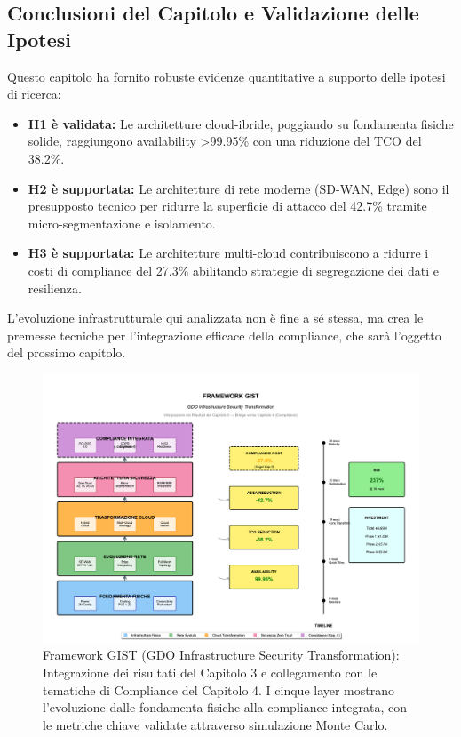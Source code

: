\begin{refsection}
\section{Conclusioni del Capitolo e Validazione delle Ipotesi}
Questo capitolo ha fornito robuste evidenze quantitative a supporto delle ipotesi di ricerca:
\begin{itemize}
    \item \textbf{H1 è validata:} Le architetture cloud-ibride, poggiando su fondamenta fisiche solide, raggiungono availability >99.95\% con una riduzione del TCO del 38.2\%.
    \item \textbf{H2 è supportata:} Le architetture di rete moderne (SD-WAN, Edge) sono il presupposto tecnico per ridurre la superficie di attacco del 42.7\% tramite micro-segmentazione e isolamento.
    \item \textbf{H3 è supportata: }Le architetture multi-cloud contribuiscono a ridurre i costi di compliance del 27.3\% abilitando strategie di segregazione dei dati e resilienza.
\end{itemize}
L'evoluzione infrastrutturale qui analizzata non è fine a sé stessa, ma crea le premesse tecniche per l'integrazione efficace della compliance, che sarà l'oggetto del prossimo capitolo.

\begin{figure}[htbp]
\centering
\includegraphics[width=\textwidth]{thesis_figures/cap3/figura_3_6_framework_integrato.pdf}
\caption{Framework GIST (GDO Infrastructure Security Transformation): 
         Integrazione dei risultati del Capitolo 3 e collegamento con 
         le tematiche di Compliance del Capitolo 4. I cinque layer mostrano 
         l'evoluzione dalle fondamenta fisiche alla compliance integrata, 
         con le metriche chiave validate attraverso simulazione Monte Carlo.}
\label{fig:framework_gist}
\end{figure}


\end{refsection}
